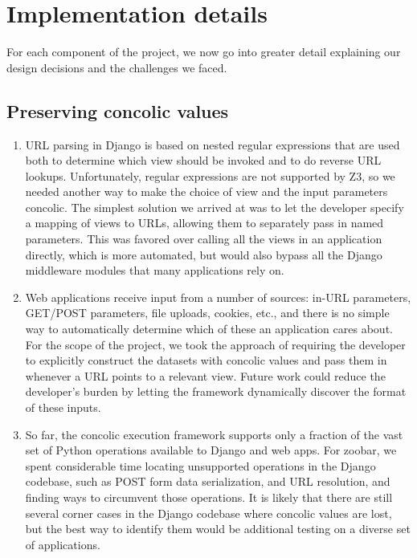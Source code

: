 \documentclass{article}
\begin{document}
\section{Implementation details}

For each component of the project, we now go into greater detail explaining our
design decisions and the challenges we faced.

\subsection{Preserving concolic values}

\begin{enumerate}
\item URL parsing in Django is based on nested regular expressions
  that are used both to determine which view should be invoked and to do
  reverse URL lookups.
  Unfortunately, regular expressions are not supported by Z3, so we
  needed another way to make the choice of view and the input
  parameters concolic. The simplest solution we arrived at was to
  let the developer specify a mapping of views to URLs, allowing them to
  separately pass in
  named parameters. This was favored over calling all the views in an
  application directly, which is more automated, but would also
  bypass all the Django middleware modules that many applications
  rely on.

\item Web applications receive input from a number of sources: in-URL
  parameters, GET/POST parameters, file uploads, cookies, etc., and
  there is no simple way to automatically determine which of these an
  application cares about. For the scope of the project, we took the
  approach of requiring the developer to explicitly construct the
  datasets with concolic values and pass them in whenever a URL points
  to a relevant view. Future work could reduce the developer's burden
  by letting the framework dynamically discover the format of these inputs.

\item So far, the concolic execution framework supports only a
  fraction of the vast set of Python operations available to Django
  and web apps. For zoobar, we spent considerable time locating
  unsupported operations in the Django codebase, such as POST form
  data serialization, and URL resolution, and finding ways to circumvent those
  operations. It is likely that there are still several corner cases
  in the Django codebase where concolic values are lost, but the best
  way to identify them would be additional testing on a diverse set of
  applications.
\end{enumerate}
\end{document}

